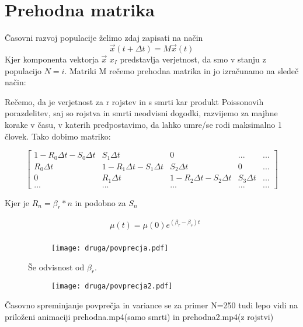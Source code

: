 \documentclass{article}
\begin{document}
\section{Prehodna matrika}

Časovni razvoj populacije želimo zdaj zapisati na način 
\begin{equation*}
\vec{x}(t+\Delta t) = M \vec{x}(t)
\end{equation*}
Kjer komponenta vektorja $\vec{x}$ $x_I$ predstavlja verjetnost, da smo v stanju z populacijo $N=i$. Matriki M rečemo prehodna matrika in jo izračunamo na sledeč način:

Rečemo, da je verjetnost za r rojstev in s smrti kar produkt Poissonovih porazdelitev, saj so rojstva in smrti neodvisni dogodki, razvijemo za majhne korake v času, v katerih predpostavimo, da lahko umre/se rodi maksimalno 1 človek. Tako dobimo matriko:

\begin{equation*}
\begin{bmatrix} 
1-R_0 \Delta t - S_0 \Delta t & S_1 \Delta t & 0 & ... & ...\\
R_0 \Delta t & 1-R_1 \Delta t - S_1 \Delta t & S_2 \Delta t  & 0 & ...\\
0 & R_1 \Delta t & 1-R_2 \Delta t - S_2 \Delta t &  S_3 \Delta t & ...\\
... & ... & ... & ... & ...
\end{bmatrix}
\end{equation*}

Kjer je $R_n = \beta_r * n$ in podobno za $S_n$

\begin{align*}
&\mu(t) = \mu(0) e^{(\beta_r - \beta_s)t} \\
\end{align*}

\begin{figure}[H]
\centering
\begin{subfigure}{.7\textwidth}
\texttt{[image: druga/povprecja.pdf]}
\end{subfigure}
\caption*{Še odvisnost od $\beta_r$.}
\end{figure}

\begin{figure}[H]
\centering
\begin{subfigure}{.7\textwidth}
\texttt{[image: druga/povprecja2.pdf]}
\end{subfigure}
\end{figure}
Časovno spreminjanje povprečja in variance se za primer N=250 tudi lepo vidi na priloženi animaciji prehodna.mp4(samo smrti) in prehodna2.mp4(z rojstvi)
\end{document}
